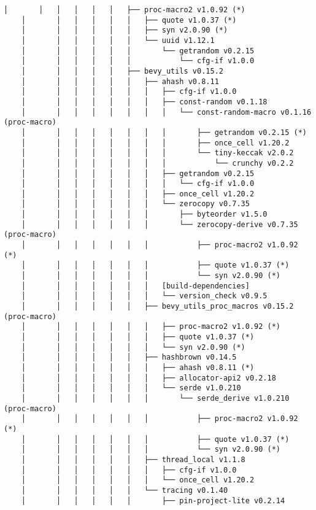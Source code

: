 \begin{lstlisting}[style=mystyle, caption={dependencias del proyecto}, label={lst:dependencias}]
    │       │   │   │   │   │   ├── proc-macro2 v1.0.92 (*)
    │       │   │   │   │   │   ├── quote v1.0.37 (*)
    │       │   │   │   │   │   ├── syn v2.0.90 (*)
    │       │   │   │   │   │   └── uuid v1.12.1
    │       │   │   │   │   │       └── getrandom v0.2.15
    │       │   │   │   │   │           └── cfg-if v1.0.0
    │       │   │   │   │   ├── bevy_utils v0.15.2
    │       │   │   │   │   │   ├── ahash v0.8.11
    │       │   │   │   │   │   │   ├── cfg-if v1.0.0
    │       │   │   │   │   │   │   ├── const-random v0.1.18
    │       │   │   │   │   │   │   │   └── const-random-macro v0.1.16 (proc-macro)
    │       │   │   │   │   │   │   │       ├── getrandom v0.2.15 (*)
    │       │   │   │   │   │   │   │       ├── once_cell v1.20.2
    │       │   │   │   │   │   │   │       └── tiny-keccak v2.0.2
    │       │   │   │   │   │   │   │           └── crunchy v0.2.2
    │       │   │   │   │   │   │   ├── getrandom v0.2.15
    │       │   │   │   │   │   │   │   └── cfg-if v1.0.0
    │       │   │   │   │   │   │   ├── once_cell v1.20.2
    │       │   │   │   │   │   │   └── zerocopy v0.7.35
    │       │   │   │   │   │   │       ├── byteorder v1.5.0
    │       │   │   │   │   │   │       └── zerocopy-derive v0.7.35 (proc-macro)
    │       │   │   │   │   │   │           ├── proc-macro2 v1.0.92 (*)
    │       │   │   │   │   │   │           ├── quote v1.0.37 (*)
    │       │   │   │   │   │   │           └── syn v2.0.90 (*)
    │       │   │   │   │   │   │   [build-dependencies]
    │       │   │   │   │   │   │   └── version_check v0.9.5
    │       │   │   │   │   │   ├── bevy_utils_proc_macros v0.15.2 (proc-macro)
    │       │   │   │   │   │   │   ├── proc-macro2 v1.0.92 (*)
    │       │   │   │   │   │   │   ├── quote v1.0.37 (*)
    │       │   │   │   │   │   │   └── syn v2.0.90 (*)
    │       │   │   │   │   │   ├── hashbrown v0.14.5
    │       │   │   │   │   │   │   ├── ahash v0.8.11 (*)
    │       │   │   │   │   │   │   ├── allocator-api2 v0.2.18
    │       │   │   │   │   │   │   └── serde v1.0.210
    │       │   │   │   │   │   │       └── serde_derive v1.0.210 (proc-macro)
    │       │   │   │   │   │   │           ├── proc-macro2 v1.0.92 (*)
    │       │   │   │   │   │   │           ├── quote v1.0.37 (*)
    │       │   │   │   │   │   │           └── syn v2.0.90 (*)
    │       │   │   │   │   │   ├── thread_local v1.1.8
    │       │   │   │   │   │   │   ├── cfg-if v1.0.0
    │       │   │   │   │   │   │   └── once_cell v1.20.2
    │       │   │   │   │   │   └── tracing v0.1.40
    │       │   │   │   │   │       ├── pin-project-lite v0.2.14

\end{lstlisting}
